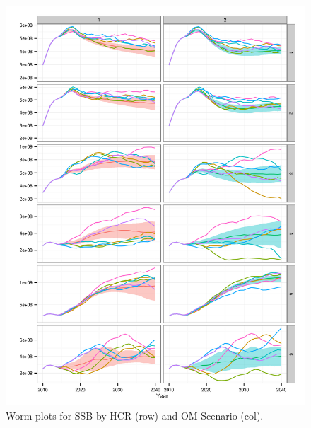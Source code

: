 \documentclass[a4paper, 10pt]{article}
\begin{document}
\begin{figure}[htbp]
\centering
\includegraphics[width=6in]{iS.png}
\caption{Worm plots for SSB by HCR (row) and OM Scenario (col).}
\label{fig:2}
\end{figure}
\end{document}
